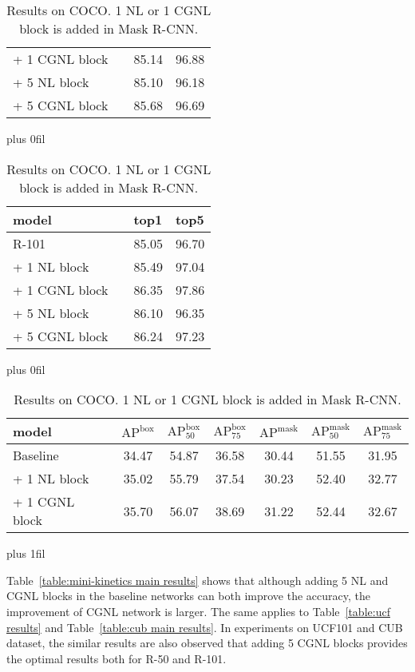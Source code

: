 \documentclass{article}
\begin{document}
\begin{table}[t]
\begin{minipage}[t]{0.67\textwidth}
\begin{subtable}[t]{1.0\textwidth}
\begin{tabularx}{.48\textwidth}{llll}
  + 1 CGNL block        && 85.14     & 96.88   \\
  \cmidrule(r){2-4}
  + 5 NL block          && 85.10     & 96.18   \\
  + 5 CGNL block        && 85.68     & 96.69   \\
  \bottomrule
\end{tabularx}
\hskip 8pt plus 0fil
\begin{tabularx}{.48\textwidth}{llll}
  \toprule
  model                 && top1      & top5    \\
  \midrule
  R-101                 && 85.05     & 96.70   \\
  \cmidrule(r){2-4}
  + 1 NL block          && 85.49     & 97.04   \\
  + 1 CGNL block        && 86.35     & 97.86   \\
  \cmidrule(r){2-4}
  + 5 NL block          && 86.10     & 96.35   \\
  + 5 CGNL block        && 86.24     & 97.23   \\
  \bottomrule
\end{tabularx}
\end{subtable}
\vskip 1.5pt plus 0fil
\begin{subtable}[t]{1.0\textwidth}
\caption{\small{
  Results on COCO.
  1 NL or 1 CGNL block is added in Mask R-CNN.
  }}
\label{table:mask rcnn}
\scriptsize
\centering
\begin{tabularx}{\textwidth}{llccc|ccc}
  \toprule
  model && $\text{AP}^{\text{box}}$ & $\text{AP}_{\text{50}}^{\text{box}}$ & $\text{AP}_{\text{75}}^{\text{box}}$ & $\text{AP}^{\text{mask}}$ & $\text{AP}_{\text{50}}^{\text{mask}}$ & $\text{AP}_{\text{75}}^{\text{mask}}$ \\
  \midrule
  Baseline             && 34.47 & 54.87 & 36.58 & 30.44 & 51.55 & 31.95 \\
  \cmidrule(r){2-8}
  + 1 NL block         && 35.02 & 55.79 & 37.54 & 30.23 & 52.40 & 32.77 \\
  + 1 CGNL block       && 35.70 & 56.07 & 38.69 & 31.22 & 52.44 & 32.67 \\
  \bottomrule
\end{tabularx}
\end{subtable}
\end{minipage}\hskip 0pt plus 1fil
\end{table}
Table~\ref{table:mini-kinetics main results} shows that although adding 5 NL and CGNL blocks in the baseline networks can both improve the accuracy, the improvement of CGNL network is larger.
The same applies to Table~\ref{table:ucf results} and Table~\ref{table:cub main results}.
In experiments on UCF101 and CUB dataset, the similar results are also observed that adding 5 CGNL blocks provides the optimal results both for R-50 and R-101.
\end{document}
